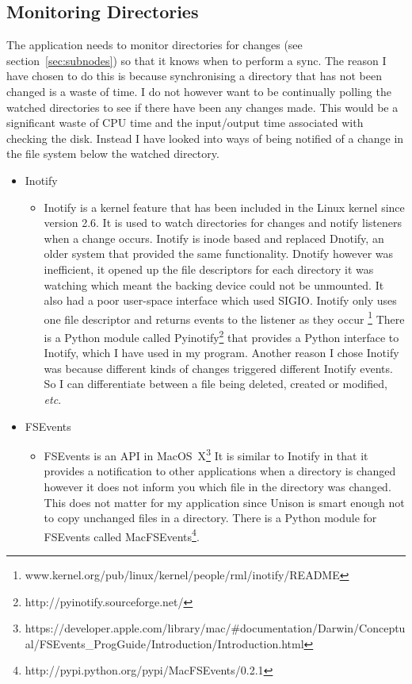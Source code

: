 \documentclass[12pt]{article}
\begin{document}
\subsection{Monitoring Directories}
The application needs to monitor directories for changes
(see section~\ref{sec:subnodes})
so that it knows when to perform a sync. The reason I have
chosen to do this is because synchronising a directory that
has not been changed is a waste of time. I do not
however want to be continually polling the watched
directories to see if there have been any changes made.
This would be a significant waste of CPU time and the input/output
time associated with checking the disk. Instead
I have looked into ways of being notified of a
change in the file system below the watched directory.
\begin{itemize}
    \item Inotify
        \begin{itemize}
        \item Inotify is a kernel feature that has been
        included in the Linux kernel since version 2.6.
        It is used to watch directories for changes
        and notify listeners when a change occurs. Inotify
        is inode based and replaced Dnotify, an older system
        that provided the same functionality. Dnotify however was
        inefficient, it opened up the file descriptors for
        each directory it was watching which meant the backing
        device could not be unmounted. 
        It also had a poor
        user-space interface which used SIGIO. Inotify only
        uses one file descriptor and returns events to the
        listener as they occur
        \footnote{www.kernel.org/pub/linux/kernel/people/rml/inotify/README}
        There is a Python module
        called Pyinotify\footnote{http://pyinotify.sourceforge.net/}
        that provides a Python interface
        to Inotify, which I have used in my program.
        Another reason I chose Inotify was because different kinds
        of changes triggered different Inotify events. So I
        can differentiate between a file being deleted, created
        or modified, \emph{etc}.
        \end{itemize}

    \item FSEvents
        \begin{itemize}
        \item FSEvents is an API in 
        MacOS~X\footnote{https://developer.apple.com/library/mac/\#documentation/Darwin/Conceptual/FSEvents\_ProgGuide/Introduction/Introduction.html}
        It is similar
        to Inotify in that it provides a notification to other
        applications when a directory is changed however
        it does not inform you which file in the directory
        was changed. This does not matter for my
        application since Unison is smart enough not to copy
        unchanged files in a directory. There is a Python module
        for FSEvents called
        MacFSEvents\footnote{http://pypi.python.org/pypi/MacFSEvents/0.2.1}. 
        

\end{itemize}
\end{itemize}
\end{document}
